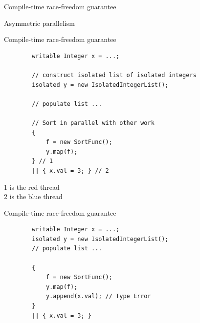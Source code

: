 \documentclass[handout]{beamer} %
\begin{document}

\begin{frame}{Compile-time race-freedom guarantee}
	\begin{center}
	\end{center}
	Asymmetric parallelism
\end{frame}

\begin{frame}[fragile]{Compile-time race-freedom guarantee}
	\begin{lstlisting}
		writable Integer x = ...;
		
		// construct isolated list of isolated integers
		isolated y = new IsolatedIntegerList();
		
		// populate list ...
		
		// Sort in parallel with other work
		{
		    f = new SortFunc();
		    y.map(f);
		} // 1
		|| { x.val = 3; } // 2
	\end{lstlisting}
	1 is the red thread\\
	2 is the blue thread
\end{frame}

\begin{frame}[fragile]{Compile-time race-freedom guarantee}
	\begin{lstlisting}
		writable Integer x = ...;
		isolated y = new IsolatedIntegerList();
		// populate list ...
		
		{
		    f = new SortFunc();
		    y.map(f);
		    y.append(x.val); // Type Error
		}
		|| { x.val = 3; }
	\end{lstlisting}
\end{frame}

\end{document}
